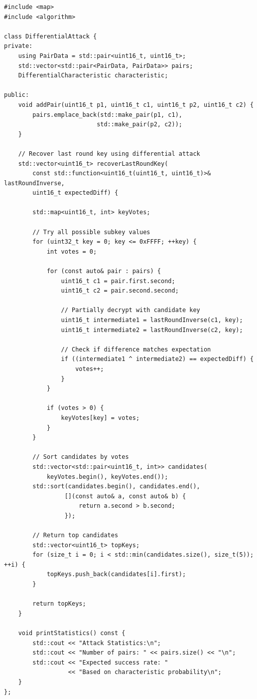 \documentclass[12pt,a4paper]{article}
\theoremstyle{definition}
\begin{document}
\begin{lstlisting}[style=cryptoCode, caption={Key Recovery Attack Implementation}]
#include <map>
#include <algorithm>

class DifferentialAttack {
private:
    using PairData = std::pair<uint16_t, uint16_t>;
    std::vector<std::pair<PairData, PairData>> pairs;
    DifferentialCharacteristic characteristic;
    
public:
    void addPair(uint16_t p1, uint16_t c1, uint16_t p2, uint16_t c2) {
        pairs.emplace_back(std::make_pair(p1, c1), 
                          std::make_pair(p2, c2));
    }
    
    // Recover last round key using differential attack
    std::vector<uint16_t> recoverLastRoundKey(
        const std::function<uint16_t(uint16_t, uint16_t)>& lastRoundInverse,
        uint16_t expectedDiff) {
        
        std::map<uint16_t, int> keyVotes;
        
        // Try all possible subkey values
        for (uint32_t key = 0; key <= 0xFFFF; ++key) {
            int votes = 0;
            
            for (const auto& pair : pairs) {
                uint16_t c1 = pair.first.second;
                uint16_t c2 = pair.second.second;
                
                // Partially decrypt with candidate key
                uint16_t intermediate1 = lastRoundInverse(c1, key);
                uint16_t intermediate2 = lastRoundInverse(c2, key);
                
                // Check if difference matches expectation
                if ((intermediate1 ^ intermediate2) == expectedDiff) {
                    votes++;
                }
            }
            
            if (votes > 0) {
                keyVotes[key] = votes;
            }
        }
        
        // Sort candidates by votes
        std::vector<std::pair<uint16_t, int>> candidates(
            keyVotes.begin(), keyVotes.end());
        std::sort(candidates.begin(), candidates.end(),
                 [](const auto& a, const auto& b) {
                     return a.second > b.second;
                 });
        
        // Return top candidates
        std::vector<uint16_t> topKeys;
        for (size_t i = 0; i < std::min(candidates.size(), size_t(5)); ++i) {
            topKeys.push_back(candidates[i].first);
        }
        
        return topKeys;
    }
    
    void printStatistics() const {
        std::cout << "Attack Statistics:\n";
        std::cout << "Number of pairs: " << pairs.size() << "\n";
        std::cout << "Expected success rate: " 
                  << "Based on characteristic probability\n";
    }
};
\end{lstlisting}
\end{document}
